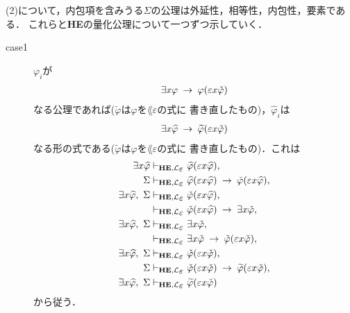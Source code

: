 \begin{metaprf}
		(2)について，内包項を含みうる$\Sigma$の公理は外延性，相等性，内包性，要素である．
		これらと{\bf HE}の量化公理について一つずつ示していく．
		\begin{description}
			\item[case1] $\varphi_{i}$が
				\begin{align}
					\exists x \varphi \hspace{0.25em}\rightarrow\hspace{0.25em} \varphi(\varepsilon x \check{\varphi})
				\end{align}
				なる公理であれば($\check{\varphi}$は$\varphi$を$\lang{\varepsilon}$の式に
				書き直したもの)，$\widehat{\varphi}_{i}$は
				\begin{align}
					\exists x \widehat{\varphi} \hspace{0.25em}\rightarrow\hspace{0.25em} \widetilde{\varphi}(\varepsilon x \check{\varphi})
				\end{align}
				なる形の式である($\widetilde{\varphi}$は$\varphi$を$\lang{\varepsilon}$の式に
				書き直したもの)．これは
				\begin{align}
					\exists x \widehat{\varphi} &\provable{\mbox{{\bf HE}},\lang{\varepsilon}} \widehat{\varphi}(\varepsilon x \widehat{\varphi}), \\
					\Sigma &\provable{\mbox{{\bf HE}},\lang{\varepsilon}} \widehat{\varphi}(\varepsilon x \widehat{\varphi}) \rarrow \check{\varphi}(\varepsilon x \widehat{\varphi}), \\
					\exists x \widehat{\varphi},\ \Sigma &\provable{\mbox{{\bf HE}},\lang{\varepsilon}} \check{\varphi}(\varepsilon x \widehat{\varphi}), \\
					&\provable{\mbox{{\bf HE}},\lang{\varepsilon}} \check{\varphi}(\varepsilon x \widehat{\varphi}) \rarrow \exists x \check{\varphi}, \\
					\exists x \widehat{\varphi},\ \Sigma &\provable{\mbox{{\bf HE}},\lang{\varepsilon}} \exists x \check{\varphi}, \\
					&\provable{\mbox{{\bf HE}},\lang{\varepsilon}} \exists x \check{\varphi} \rarrow \check{\varphi}(\varepsilon x \check{\varphi}), \\
					\exists x \widehat{\varphi},\ \Sigma &\provable{\mbox{{\bf HE}},\lang{\varepsilon}} \check{\varphi}(\varepsilon x \check{\varphi}), \\
					\Sigma &\provable{\mbox{{\bf HE}},\lang{\varepsilon}} \check{\varphi}(\varepsilon x \check{\varphi}) \rarrow  \widetilde{\varphi}(\varepsilon x \check{\varphi}), \\
					\exists x \widehat{\varphi},\ \Sigma &\provable{\mbox{{\bf HE}},\lang{\varepsilon}} \widetilde{\varphi}(\varepsilon x \check{\varphi})
				\end{align}
				から従う．
				

\end{description}
\end{metaprf}
